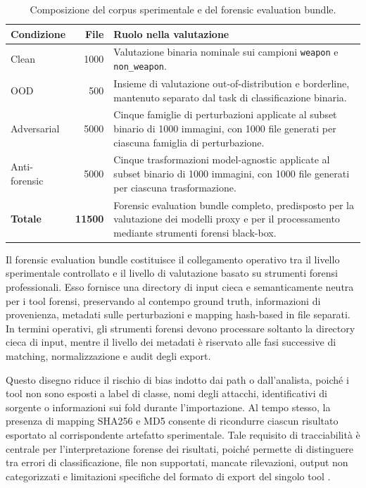 \begin{table}[H]
\centering
\caption{Composizione del corpus sperimentale e del forensic evaluation bundle.}
\label{tab:results-corpus-composition}
\begin{tabularx}{0.88\textwidth}{@{}l r X@{}}
\toprule
\textbf{Condizione} & \textbf{File} & \textbf{Ruolo nella valutazione} \\
\midrule

Clean
&
1000
&
Valutazione binaria nominale sui campioni \texttt{weapon} e
\texttt{non\_weapon}. \\

OOD
&
500
&
Insieme di valutazione out-of-distribution e borderline, mantenuto separato dal
task di classificazione binaria. \\

Adversarial
&
5000
&
Cinque famiglie di perturbazioni applicate al subset binario di 1000 immagini,
con 1000 file generati per ciascuna famiglia di perturbazione. \\

Anti-forensic
&
5000
&
Cinque trasformazioni model-agnostic applicate al subset binario di 1000
immagini, con 1000 file generati per ciascuna trasformazione. \\

\midrule
\textbf{Totale}
&
\textbf{11500}
&
Forensic evaluation bundle completo, predisposto per la valutazione dei modelli
proxy e per il processamento mediante strumenti forensi black-box. \\

\bottomrule
\end{tabularx}
\end{table}

Il forensic evaluation bundle costituisce il collegamento operativo tra il
livello sperimentale controllato e il livello di valutazione basato su strumenti
forensi professionali. Esso fornisce una directory di input cieca e
semanticamente neutra per i tool forensi, preservando al contempo ground truth,
informazioni di provenienza, metadati sulle perturbazioni e mapping hash-based in
file separati. In termini operativi, gli strumenti forensi devono processare
soltanto la directory cieca di input, mentre il livello dei metadati è riservato
alle fasi successive di matching, normalizzazione e audit degli export.

Questo disegno riduce il rischio di bias indotto dai path o dall'analista, poiché
i tool non sono esposti a label di classe, nomi degli attacchi, identificativi di
sorgente o informazioni sui fold durante l'importazione. Al tempo stesso, la
presenza di mapping SHA256 e MD5 consente di ricondurre ciascun risultato
esportato al corrispondente artefatto sperimentale. Tale requisito di
tracciabilità è centrale per l'interpretazione forense dei risultati, poiché
permette di distinguere tra errori di classificazione, file non supportati,
mancate rilevazioni, output non categorizzati e limitazioni specifiche del formato
di export del singolo tool \cite{casey2011digital,nist2006guide,iso27041,iso27042,swgde2014validation}.

